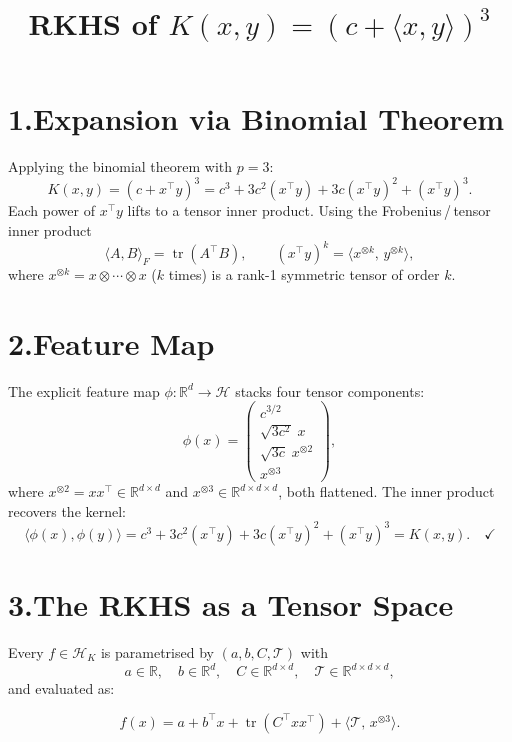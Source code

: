 \documentclass[11pt]{article}
\title{\Large RKHS of $K(x,y)=(c+\langle x,y\rangle)^3$}
\author{}
\date{}
\begin{document}
\maketitle
\thispagestyle{empty}

\section*{1.\quad Expansion via Binomial Theorem}

Applying the binomial theorem with $p=3$:
\[
  K(x,y) = (c + x^\top y)^3
          = c^3 + 3c^2(x^\top y) + 3c(x^\top y)^2 + (x^\top y)^3.
\]
Each power of $x^\top y$ lifts to a tensor inner product.  Using the
Frobenius\,/\,tensor inner product
\[
  \langle A,B\rangle_F = \operatorname{tr}(A^\top B),
  \qquad
  (x^\top y)^k = \langle x^{\otimes k},\, y^{\otimes k}\rangle,
\]
where $x^{\otimes k}=x\otimes\cdots\otimes x$ ($k$ times) is a rank-1
symmetric tensor of order $k$.

\section*{2.\quad Feature Map}

The explicit feature map $\phi:\mathbb{R}^d\to\mathcal{H}$ stacks four
tensor components:
\[
  \phi(x)
  =\begin{pmatrix}
      c^{3/2}\\[4pt]
      \sqrt{3c^2}\;x\\[4pt]
      \sqrt{3c}\;x^{\otimes 2}\\[4pt]
      x^{\otimes 3}
    \end{pmatrix},
\]
where $x^{\otimes 2}=xx^\top\in\mathbb{R}^{d\times d}$ and
$x^{\otimes 3}\in\mathbb{R}^{d\times d\times d}$, both flattened.
The inner product recovers the kernel:
\[
  \langle\phi(x),\phi(y)\rangle
  = c^3 + 3c^2(x^\top y) + 3c(x^\top y)^2 + (x^\top y)^3
  = K(x,y).\quad\checkmark
\]

\section*{3.\quad The RKHS as a Tensor Space}

Every $f\in\mathcal{H}_K$ is parametrised by $(a,b,C,\mathcal{T})$ with
\[
  a\in\mathbb{R},\quad
  b\in\mathbb{R}^d,\quad
  C\in\mathbb{R}^{d\times d},\quad
  \mathcal{T}\in\mathbb{R}^{d\times d\times d},
\]
and evaluated as:
\begin{mathbox}
\[
  f(x) = a + b^\top x + \operatorname{tr}(C^\top xx^\top)
        + \langle \mathcal{T},\, x^{\otimes 3}\rangle.
\]
\end{mathbox}
\end{document}
